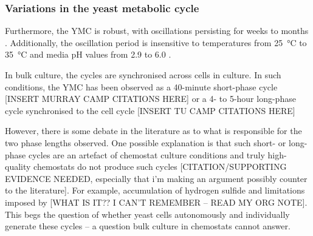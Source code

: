 \subsubsection{Variations in the yeast metabolic cycle} %
\label{subsubsec:intro-ymc-definition-variation}

Furthermore, the YMC is robust, with oscillations persisting for weeks to months \citep{lloydRedoxRhythmicityClocks2007}.
Additionally, the oscillation period is insensitive to temperatures from \SI{25}{\celsius} to \SI{35}{\celsius} and media pH values from
2.9 to 6.0 \citep{lloydUltradianMetronomeTimekeeper2005}.

In bulk culture,
the cycles are synchronised across cells in culture.
In such conditions, the YMC has been observed as a
40-minute short-phase cycle [INSERT MURRAY CAMP CITATIONS HERE] or
a 4- to 5-hour long-phase cycle synchronised to the cell cycle [INSERT TU CAMP CITATIONS HERE]

%
However, there is some debate in the literature as to what is responsible for the two phase lengths observed.
One possible explanation is that such short- or long-phase cycles are an artefact of chemostat culture conditions and truly high-quality chemostats do not produce such cycles [CITATION/SUPPORTING EVIDENCE NEEDED, especially that i'm making an argument possibly counter to the literature].
For example, accumulation of hydrogen sulfide \citep{oneillCircadianRhythmsPersist2011} and limitations imposed by [WHAT IS IT?? I CAN'T REMEMBER -- READ MY ORG NOTE].
This begs the question of whether yeast cells autonomously and individually generate these cycles -- a question bulk culture in chemostats cannot answer.  %

